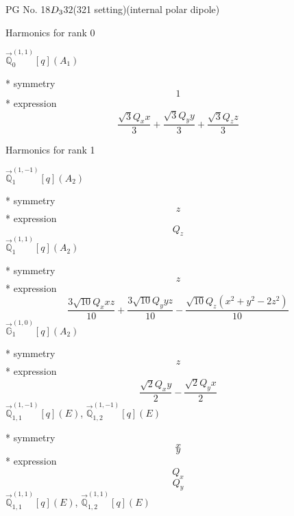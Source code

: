\documentclass[fleqn,8pt]{jsarticle}
\begin{document}
\setcounter{MaxMatrixCols}{32}

\renewcommand{\tablename}{Table~}
\renewcommand{\figurename}{Figure~}
\begin{center}
\LARGE
PG No. 18\quad$D_{\rm 3}$\quad$32$\quad(321 setting)\quad[ trigonal ] (internal polar dipole)
\end{center}

\noindent * Harmonics for rank 0

\noindent\quad $\vec{\mathbb{Q}}_{0}^{(1,1)}[q](A_{1})$

\noindent\quad ** symmetry
\begin{dmath*}
1
\end{dmath*}
\noindent\quad ** expression
\begin{dmath*}
\frac{\sqrt{3} Q_{x} x}{3} + \frac{\sqrt{3} Q_{y} y}{3} + \frac{\sqrt{3} Q_{z} z}{3}
\end{dmath*}

\noindent * Harmonics for rank 1

\noindent\quad $\vec{\mathbb{Q}}_{1}^{(1,-1)}[q](A_{2})$

\noindent\quad ** symmetry
\begin{dmath*}
z
\end{dmath*}
\noindent\quad ** expression
\begin{dmath*}
Q_{z}
\end{dmath*}
\noindent\quad $\vec{\mathbb{Q}}_{1}^{(1,1)}[q](A_{2})$

\noindent\quad ** symmetry
\begin{dmath*}
z
\end{dmath*}
\noindent\quad ** expression
\begin{dmath*}
\frac{3 \sqrt{10} Q_{x} x z}{10} + \frac{3 \sqrt{10} Q_{y} y z}{10} - \frac{\sqrt{10} Q_{z} \left(x^{2} + y^{2} - 2 z^{2}\right)}{10}
\end{dmath*}
\noindent\quad $\vec{\mathbb{G}}_{1}^{(1,0)}[q](A_{2})$

\noindent\quad ** symmetry
\begin{dmath*}
z
\end{dmath*}
\noindent\quad ** expression
\begin{dmath*}
\frac{\sqrt{2} Q_{x} y}{2} - \frac{\sqrt{2} Q_{y} x}{2}
\end{dmath*}
\noindent\quad $\vec{\mathbb{Q}}_{1,1}^{(1,-1)}[q](E)$, $\vec{\mathbb{Q}}_{1,2}^{(1,-1)}[q](E)$

\noindent\quad ** symmetry
\begin{dmath*}
x
\end{dmath*}
\begin{dmath*}
y
\end{dmath*}
\noindent\quad ** expression
\begin{dmath*}
Q_{x}
\end{dmath*}
\begin{dmath*}
Q_{y}
\end{dmath*}
\noindent\quad $\vec{\mathbb{Q}}_{1,1}^{(1,1)}[q](E)$, $\vec{\mathbb{Q}}_{1,2}^{(1,1)}[q](E)$
\end{document}
